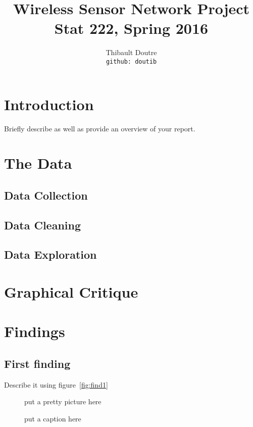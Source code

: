 \documentclass[11pt]{article}
\title{Wireless Sensor Network Project\\
  Stat 222, Spring 2016}
\author{
  Thibault Doutre\\
  \texttt{github: doutib}
}
\begin{document}
\maketitle



\section{Introduction}

Briefly describe \cite{tolle2005macroscope, yang2003redwoods} as well as
provide an overview of your report.

\section{The Data}


\subsection{Data Collection}


\subsection{Data Cleaning}


\subsection{Data Exploration}


\section{Graphical Critique}


\section{Findings}


\subsection{First finding}

Describe it using figure~\ref{fig:find1}

\begin{figure}
  \centering
    put a pretty picture here
  \caption{put a caption here}
  \label{fig:find3}
\end{figure}
\end{document}

